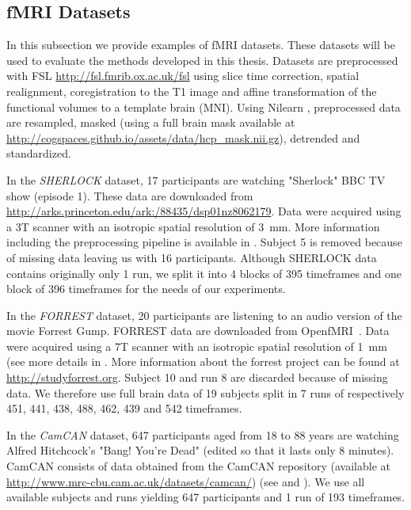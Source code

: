 \subsection{fMRI Datasets}
\label{srm:datasets:fmri}
In this subsection we provide examples of fMRI datasets. These datasets will be
used to evaluate the methods developed in this thesis.
Datasets are preprocessed with FSL \url{http://fsl.fmrib.ox.ac.uk/fsl} using slice time correction, spatial realignment, coregistration to the T1 image and affine transformation of the functional volumes to a template brain (MNI).
Using Nilearn \cite{abraham2014machine}, preprocessed data are resampled, masked
(using a full brain mask available at \url{http://cogspaces.github.io/assets/data/hcp_mask.nii.gz}), detrended and standardized.

In the \emph{SHERLOCK} dataset, 17 participants are watching "Sherlock" BBC TV show (episode 1). 
% 
These data are downloaded from \url{http://arks.princeton.edu/ark:/88435/dsp01nz8062179}. 
% 
Data were acquired using a 3T scanner with an isotropic spatial resolution of 3 mm. 
% 
More information including the preprocessing pipeline is available in \cite{sherlock}.
% 
Subject 5 is removed because of missing data leaving us with 16 participants.
% 
Although SHERLOCK data contains originally only 1 run, we split it into 4 blocks of 395 timeframes and one block of 396 timeframes for the needs of our experiments. 

In the \emph{FORREST} dataset, 20 participants are listening to an audio version of the movie Forrest Gump.
% 
FORREST data are downloaded from OpenfMRI~\cite{poldrack2013toward}. 
% 
Data were acquired using a 7T scanner with an isotropic spatial resolution of 1 mm (see more details in \cite{hanke2014high}.
% 
More information about the forrest project can be found at \url{http://studyforrest.org}.
% 
Subject 10 and run 8 are discarded because of missing data.
% 
We therefore use full brain data of 19 subjects split in 7 runs of respectively 451, 441, 438, 488, 462, 439 and 542 timeframes.


In the \emph{CamCAN} dataset, 647 participants aged from 18 to 88 years are watching Alfred Hitchcock's "Bang! You're Dead" (edited so that it lasts only 8 minutes).
% 
CamCAN consists of data obtained from the CamCAN repository (available at \url{http://www.mrc-cbu.cam.ac.uk/datasets/camcan/}) (see \cite{taylor2017cambridge} and \cite{shafto2014cambridge}).
% 
We use all available subjects and runs yielding 647 participants and 1 run of 193 timeframes.


